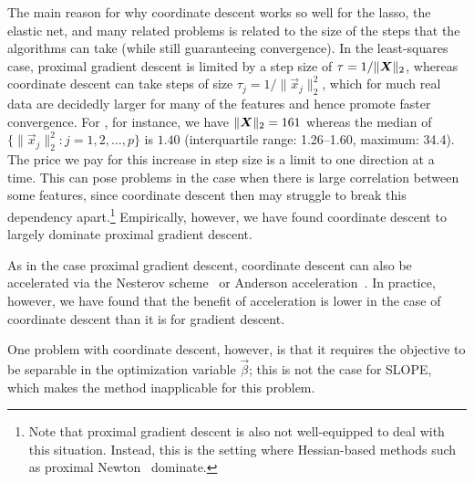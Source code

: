 The main reason for why coordinate descent works so well for the lasso, the elastic net, and many related problems is related to the size of the steps that the algorithms can take (while still guaranteeing convergence). In the least-squares case, proximal gradient descent is limited by a step size of \(\tau = 1/\lVert \boldsymbol{X}\rVert_2\), whereas coordinate descent can take steps of size \(\tau_j =1/\lVert \vec{x}_j \rVert_2^2\), which for much real data are decidedly larger for many of the features and hence promote faster convergence. For , for instance, we have \(\lVert \boldsymbol{X}\rVert_2 = 161\) whereas the median of \(\{\lVert \vec{x}_j\rVert_2^2 : j = 1,2,\dots,p\}\) is \(1.40\) (interquartile range: 1.26--1.60, maximum: 34.4). The price we pay for this increase in step size is a limit to one direction at a time. This can pose problems in the case when there is large correlation between some features, since coordinate descent then may struggle to break this dependency apart.\footnote{Note that proximal gradient descent is also not well-equipped to deal with this situation. Instead, this is the setting where Hessian-based methods such as proximal Newton~\parencite{lee2014} dominate.} Empirically, however, we have found coordinate descent to largely dominate proximal gradient descent.

As in the case proximal gradient descent, coordinate descent can also be accelerated via the Nesterov scheme~\parencite{nesterov1983} or Anderson acceleration~\parencite{bertrand2021}. In practice, however, we have found that the benefit of acceleration is lower in the case of coordinate descent than it is for gradient descent.


One problem with coordinate descent, however, is that it requires the objective to be separable in the optimization variable \(\vec{\beta}\); this is not the case for SLOPE, which makes the method inapplicable for this problem.


